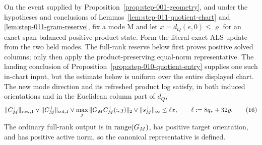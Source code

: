 \begin{proposition}\label{prop:step-011-block-contraction}
On the event supplied by Proposition~\ref{prop:step-001-geometry},
and under the hypotheses and conclusions of
Lemmas~\ref{lem:step-011-quotient-chart} and
\ref{lem:step-011-gram-reserve}, fix a mode M and let
\(x=d_Q(e,0)\le\varrho\) for an exact-span balanced positive-product state.
Form the literal exact ALS update from the two held modes. The full-rank
reserve below first proves positive solved columns; only then apply the
product-preserving equal-norm representative. The landing conclusion of
Proposition~\ref{prop:step-010-quotient-entry}
supplies one such in-chart input, but the estimate below is uniform over
the entire displayed chart.
The new mode direction and its refreshed product log satisfy, in both
induced orientations and in the Euclidean column part of \(d_Q\),
\[
 \|C_M^+\|_{\rm row,1}\vee\|C_M^+\|_{\rm col,1}
 \vee\max_j\|G_MC_M^+(:,j)\|_2
 \vee\|s_M^+\|_\infty
 \le \ell x,
 \qquad \ell:=8q_*+32\varrho.
\tag{16}
\]
The ordinary full-rank output is in \({\rm range}(G_M)\), has positive
target orientation, and has positive active norm, so the canonical
representative is defined.


\end{proposition}
